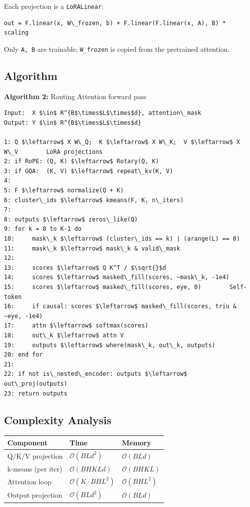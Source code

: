 Each projection is a \texttt{LoRALinear}:

\begin{lstlisting}
out = F.linear(x, W\_frozen, b) + F.linear(F.linear(x, A), B) * scaling
\end{lstlisting}

Only \texttt{A, B} are trainable; \texttt{W\_frozen} is copied from the pretrained attention.

\subsection{Algorithm}

\textbf{Algorithm 2:} Routing Attention forward pass
\begin{lstlisting}
Input:  X $\in$ R^{B$\times$L$\times$d}, attention\_mask
Output: Y $\in$ R^{B$\times$L$\times$d}

1: Q $\leftarrow$ X W\_Q;  K $\leftarrow$ X W\_K;  V $\leftarrow$ X W\_V        LoRA projections
2: if RoPE: (Q, K) $\leftarrow$ Rotary(Q, K)
3: if GQA:  (K, V) $\leftarrow$ repeat\_kv(K, V)
4:
5: F $\leftarrow$ normalize(Q + K)
6: cluster\_ids $\leftarrow$ kmeans(F, K, n\_iters)
7:
8: outputs $\leftarrow$ zeros\_like(Q)
9: for k = 0 to K-1 do
10:     mask\_k $\leftarrow$ (cluster\_ids == k) | (arange(L) == 0)
11:     mask\_k $\leftarrow$ mask\_k & valid\_mask
12:
13:     scores $\leftarrow$ Q K^T / $\sqrt{}$d
14:     scores $\leftarrow$ masked\_fill(scores, ~mask\_k, -1e4)
15:     scores $\leftarrow$ masked\_fill(scores, eye, 0)        Self-token
16:     if causal: scores $\leftarrow$ masked\_fill(scores, triu & ~eye, -1e4)
17:     attn $\leftarrow$ softmax(scores)
18:     out\_k $\leftarrow$ attn V
19:     outputs $\leftarrow$ where(mask\_k, out\_k, outputs)
20: end for
21:
22: if not is\_nested\_encoder: outputs $\leftarrow$ out\_proj(outputs)
23: return outputs
\end{lstlisting}

\subsection{Complexity Analysis}

\begin{table}[H]
\centering
\small
\begin{tabular}{lll}
\toprule
\textbf{Component} & \textbf{Time} & \textbf{Memory} \\
\midrule
Q/K/V projection & $\mathcal{O}(BLd^2)$ & $\mathcal{O}(BLd)$ \\
k-means (per iter) & $\mathcal{O}(BHKLd)$ & $\mathcal{O}(BHKL)$ \\
Attention loop & $\mathcal{O}(K \cdot BHL^2)$ & $\mathcal{O}(BHL^2)$ \\
Output projection & $\mathcal{O}(BLd^2)$ & $\mathcal{O}(BLd)$ \\
\bottomrule
\end{tabular}
\end{table}

